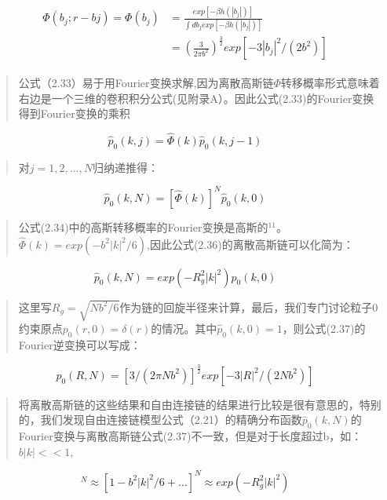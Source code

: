 \begin{equation}
\begin{split}
\begin{aligned}
\varPhi(b_{j};r-b{j})=\varPhi(b_{j})&=\frac{exp[-\beta h(|b_{j}|)]}{\int db_{j}exp[-\beta h(|b_{j}|)]} \\ &=(\frac{3}{2 \pi b^2})^{\frac{3}{2}}exp[-3|b_{j}|^2 / (2b^2)]
\end{aligned}
\end{split}
\end{equation}
\begin{quotation}
公式（2.33）易于用Fourier变换求解,因为离散高斯链$\varPhi$转移概率形式意味着右边是一个三维的卷积积分公式(见附录A）。因此公式(2.33)的Fourier变换得到Fourier变换的乘积
\end{quotation}
\begin{equation}
\hat{p}_{0}(k,j)=\hat{\varPhi}(k)\hat{p}_{0}(k,j-1)
\end{equation}
\begin{quotation}
对$j=1,2,\dots ,N$归纳递推得：
\end{quotation}
\begin{equation}
\hat{p}_{0}(k,N)=[\hat{\varPhi}(k)]^N\hat{p}_{0}(k,0)
\end{equation}
\begin{quotation}
公式(2.34)中的高斯转移概率的Fourier变换是高斯的$^{11}$。$\hat{\varPhi}(k)=exp(-b^2|k|^2/6)$,因此公式(2.36)的离散高斯链可以化简为：
\end{quotation}
\begin{equation}
\hat{p}_{0}(k,N)=exp(-R_{g}^2|k|^2)\hat{p}_{0}(k,0)
\end{equation}
\begin{quotation}
这里写$R_{g}=\sqrt{Nb^2/6}$作为链的回旋半径来计算，最后，我们专门讨论粒子0约束原点$p_{0}(r,0)=\delta(r)$的情况。其中$\hat{p}_{0}(k,0)=1$，则公式(2.37)的Fourier逆变换可以写成：
\end{quotation}
\begin{equation}
p_{0}(R,N)=[3/(2\pi Nb^2)]^\frac{3}{2}exp[-3|R|^2/(2Nb^2)]
\end{equation}
\begin{quotation}
将离散高斯链的这些结果和自由连接链的结果进行比较是很有意思的，特别的，我们发现自由连接链模型公式（2.21）的精确分布函数$\hat{p}_{0}(k,N)$的Fourier变换与离散高斯链公式(2.37)不一致，但是对于长度超过b，如：$b|k|<<1$,
\end{quotation}
\begin{equation}
[j_{0}(b|k|)]^N\approx [1-b^2|k|^2/6+\dots]^N\approx exp(-R_{g}^2|k|^2)
\end{equation}
